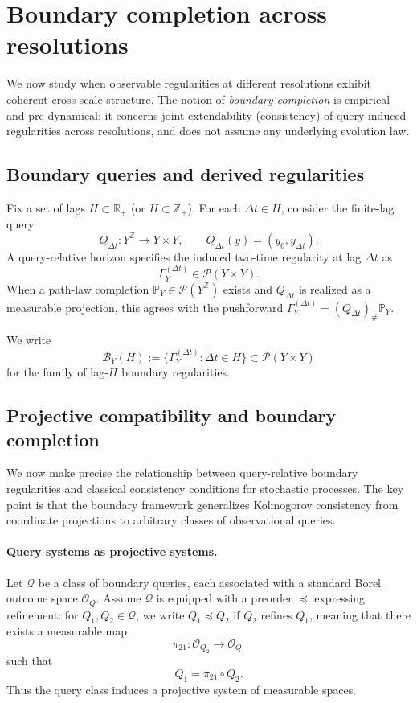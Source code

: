 \documentclass[11pt]{article}
\begin{document}

\section{Boundary completion across resolutions}
\label{sec:boundary-completion}

We now study when observable regularities at different resolutions exhibit coherent
cross-scale structure.  The notion of \emph{boundary completion} is empirical and
pre-dynamical: it concerns joint extendability (consistency) of query-induced
regularities across resolutions, and does not assume any underlying evolution law.

\subsection{Boundary queries and derived regularities}
\label{subsec:boundary-queries-derived}

Fix a set of lags $H\subset\mathbb R_+$ (or $H\subset\mathbb Z_+$).  For each $\Delta t\in H$,
consider the finite-lag query
\[
Q_{\Delta t}:Y^{\mathbb Z}\to Y\times Y,
\qquad
Q_{\Delta t}(y)=(y_0,y_{\Delta t}).
\]
A query-relative horizon specifies the induced two-time regularity at lag $\Delta t$ as
\[
\Gamma_Y^{(\Delta t)} \in \mathcal P(Y\times Y).
\]
When a path-law completion $\mathbb P_Y\in\mathcal P(Y^{\mathbb Z})$ exists and $Q_{\Delta t}$ is
realized as a measurable projection, this agrees with the pushforward
$\Gamma_Y^{(\Delta t)}=(Q_{\Delta t})_\#\mathbb P_Y$.

We write
\[
\mathcal B_Y(H):=\{\Gamma_Y^{(\Delta t)}:\Delta t\in H\}\subset\mathcal P(Y\times Y)
\]
for the family of lag-$H$ boundary regularities.

\subsection{Projective compatibility and boundary completion}
\label{subsec:projective-compatibility}

We now make precise the relationship between query-relative boundary regularities and
classical consistency conditions for stochastic processes.  The key point is that the
boundary framework generalizes Kolmogorov consistency from coordinate projections to
arbitrary classes of observational queries.

\paragraph{Query systems as projective systems.}
Let $\mathcal Q$ be a class of boundary queries, each associated with a standard Borel
outcome space $\mathcal O_Q$.  Assume $\mathcal Q$ is equipped with a preorder $\preceq$
expressing refinement: for $Q_1,Q_2\in\mathcal Q$, we write $Q_1\preceq Q_2$ if $Q_2$ refines
$Q_1$, meaning that there exists a measurable map
\[
\pi_{21}:\mathcal O_{Q_2}\to\mathcal O_{Q_1}
\]
such that
\[
Q_1=\pi_{21}\circ Q_2.
\]
Thus the query class induces a projective system of measurable spaces.
\end{document}
